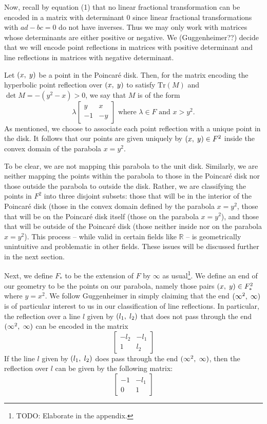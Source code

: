 \documentclass[12pt]{article}
\newcommand{\R}{\mathbb{R}}
\newcommand{\poincare}{Poincar\'{e} }
\newcommand{\Tr}{\text{Tr}}
\newcommand{\ttc}{, \hspace{1mm}}
\newcommand{\lftmat}[4]{\begin{bmatrix} {#1} & {#2} \\ {#3} & {#4} \end{bmatrix}}
\newcommand{\pointmat}[2]{\lftmat{{#2}}{{#1}}{-1}{-{#2}}}
\newcommand{\stanpointmat}{\pointmat{x}{y}}
\newcommand{\linenoendmat}[2]{\begin{bmatrix} -{#2} & -{#1} \\ 1 & {#2} \end{bmatrix}}
\newcommand{\stanlinenoendmat}{\linenoendmat{l_1}{l_2}}
\newcommand{\lineendmat}[2]{\begin{bmatrix} -1 & -{#1} \\ 0 & 1 \end{bmatrix}}
\newcommand{\stanlineendmat}{\lineendmat{l_1}{l_2}}
\newcommand{\specialend}{(\infty^2\ttc\infty)}
\theoremstyle{plain}
\theoremstyle{definition}
\begin{document}
Now, recall by equation (1) that no linear fractional transformation can be encoded in a matrix with determinant 0 since linear fractional transformations with $ad - bc = 0$ do not have inverses. Thus we may only work with matrices whose determinants are either positive or negative. We (Guggenheimer??) decide that we will encode point reflections in matrices with positive determinant and line reflections in matrices with negative determinant. 


Let $(x \ttc y)$ be a point in the \poincare disk. Then, for the matrix encoding the hyperbolic point reflection over $(x \ttc y)$ to satisfy $\Tr(M)$ and $\det M = -(y^2 - x) > 0$, we say that $M$ is of the form
\begin{equation} 
	\lambda \stanpointmat \text{ where } \lambda \in F \text{ and } x > y^2. 
\end{equation}	
As mentioned, we choose to associate each point reflection with a unique point in the disk. It follows that our points are given uniquely by $(x \ttc y) \in F^2$ inside the convex domain of the parabola $x = y^2$.

To be clear, we are not mapping this parabola to the unit disk. Similarly, we are neither mapping the points within the parabola to those in the \poincare disk nor those outside the parabola to outside the disk. Rather, we are classifying the points in $F^2$ into three disjoint subsets: those that will be in the interior of the \poincare disk (those in the convex domain defined by the parabola $x = y^2$, those that will be on the \poincare disk itself (those on the parabola $x = y^2$), and those that will be outside of the \poincare disk (those neither inside nor on the parabola $x = y^2$). This process -- while valid in certain fields like $\R$ -- is geometrically unintuitive and problematic in other fields. These issues will be discussed further in the next section. 

Next, we define $F_*$ to be the extension of $F$ by $\infty$ as usual\footnote{TODO: Elaborate in the appendix.}. We define an end of our geometry to be the points on our parabola, namely those pairs $(x \ttc y) \in F_*^2$ where $y = x^2$. We follow Guggenheimer in simply claiming that the end $\specialend$ is of particular interest to us in our classification of line reflections. In particular, the reflection over a line $l$ given by $(l_1\ttc l_2)$ that does not pass through the end $\specialend$ can be encoded in the matrix
\[\stanlinenoendmat\]
If the line $l$ given by $(l_1\ttc l_2)$ does pass through the end $\specialend$, then the reflection over $l$ can be given by the following matrix:
\[
	\stanlineendmat
\]
\end{document}
